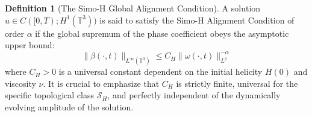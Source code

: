 \documentclass[12pt,a4paper]{article}
\theoremstyle{plain}
\theoremstyle{definition}
\newtheorem{definition}[theorem]{Definition}
\theoremstyle{remark}
\begin{document}
\begin{definition}[The Simo-H Global Alignment Condition]
A solution $u \in C([0,T); H^1(\mathbb{T}^3))$ is said to satisfy the Simo-H Alignment Condition of order $\alpha$ if the global supremum of the phase coefficient obeys the asymptotic upper bound:
\begin{equation}
    \|\beta(\cdot, t)\|_{L^\infty(\mathbb{T}^3)} \leq C_H \|\omega(\cdot, t)\|_{L^2}^{-\alpha}
\end{equation}
where $C_H > 0$ is a universal constant dependent on the initial helicity $H(0)$ and viscosity $\nu$. It is crucial to emphasize that $C_H$ is strictly finite, universal for the specific topological class $\mathcal{S}_H$, and perfectly independent of the dynamically evolving amplitude of the solution.
\end{definition}
\end{document}
